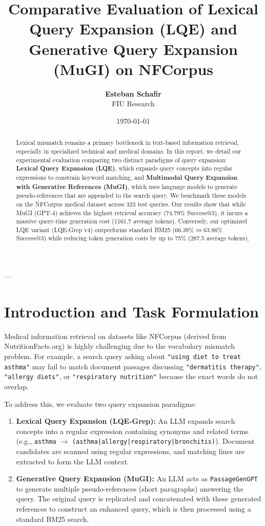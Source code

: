 \documentclass[11pt,a4paper]{article}
\title{\textbf{Comparative Evaluation of Lexical Query Expansion (LQE) and Generative Query Expansion (MuGI) on NFCorpus}}
\author{\textbf{Esteban Schafir} \\ FIU Research}
\date{\today}
\begin{document}
\maketitle

\begin{abstract}
Lexical mismatch remains a primary bottleneck in text-based information retrieval, especially in specialized technical and medical domains. In this report, we detail our experimental evaluation comparing two distinct paradigms of query expansion: \textbf{Lexical Query Expansion (LQE)}, which expands query concepts into regular expressions to constrain keyword matching, and \textbf{Multimodal Query Expansion with Generative References (MuGI)}, which uses language models to generate pseudo-references that are appended to the search query. We benchmark these models on the NFCorpus medical dataset across 323 test queries. Our results show that while MuGI (GPT-4) achieves the highest retrieval accuracy (74.79\% Success@3), it incurs a massive query-time generation cost (1161.7 average tokens). Conversely, our optimized LQE variant (LQE-Grep v4) outperforms standard BM25 (66.39\% vs 63.86\% Success@3) while reducing token generation costs by up to 75\% (287.5 average tokens).
\end{abstract}

---

\section{Introduction and Task Formulation}
Medical information retrieval on datasets like NFCorpus (derived from NutritionFacts.org) is highly challenging due to the vocabulary mismatch problem. For example, a search query asking about \texttt{"using diet to treat asthma"} may fail to match document passages discussing \texttt{"dermatitis therapy"}, \texttt{"allergy diets"}, or \texttt{"respiratory nutrition"} because the exact words do not overlap.

To address this, we evaluate two query expansion paradigms:
\begin{enumerate}
    \item \textbf{Lexical Query Expansion (LQE-Grep):} An LLM expands search concepts into a regular expression containing synonyms and related terms (e.g., \texttt{asthma} $\to$ \texttt{(asthma|allergy|respiratory|bronchitis)}). Document candidates are scanned using regular expressions, and matching lines are extracted to form the LLM context.
    \item \textbf{Generative Query Expansion (MuGI):} An LLM acts as \texttt{PassageGenGPT} to generate multiple pseudo-references (short paragraphs) answering the query. The original query is replicated and concatenated with these generated references to construct an enhanced query, which is then processed using a standard BM25 search.
\end{enumerate}
\end{document}
